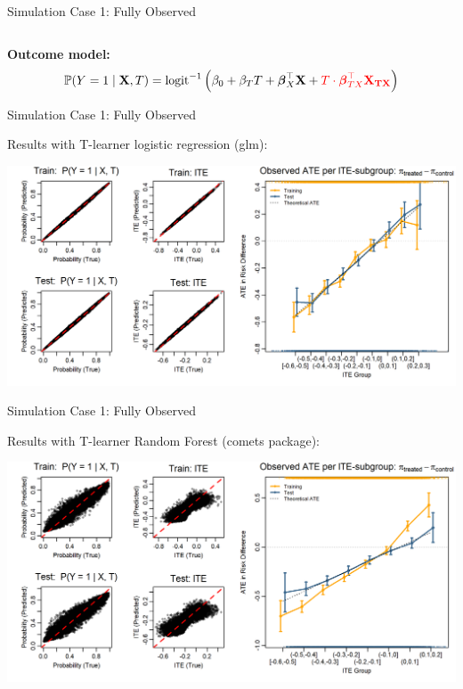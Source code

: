 \documentclass[onlytextwidth,english]{beamer}\usepackage[]{graphicx}\usepackage[]{xcolor}
\begin{document}
\begin{frame}{Simulation Case 1: Fully Observed}
\begin{columns}
\end{columns}


\vspace{0.3em}
\textbf{Outcome model:}
\[
\mathbb{P}(Y = 1 \mid \mathbf{X}, T) = \text{logit}^{-1} \left(
\beta_0 + \beta_T T + \boldsymbol{\beta}_X^\top \mathbf{X}
+ \textcolor{red}{T \cdot \boldsymbol{\beta}_{TX}^\top \mathbf{X_{TX}}}
\right)
\]


\end{frame}





\begin{frame}{Simulation Case 1: Fully Observed}

Results with T-learner logistic regression (glm):

\includegraphics[width=\textwidth]{img/fully_observed_glm_tlearner.png}

\end{frame}


\begin{frame}{Simulation Case 1: Fully Observed}

Results with T-learner Random Forest (comets package):

\includegraphics[width=\textwidth]{img/observed_tuned_rf.png}

\end{frame}
\end{document}
